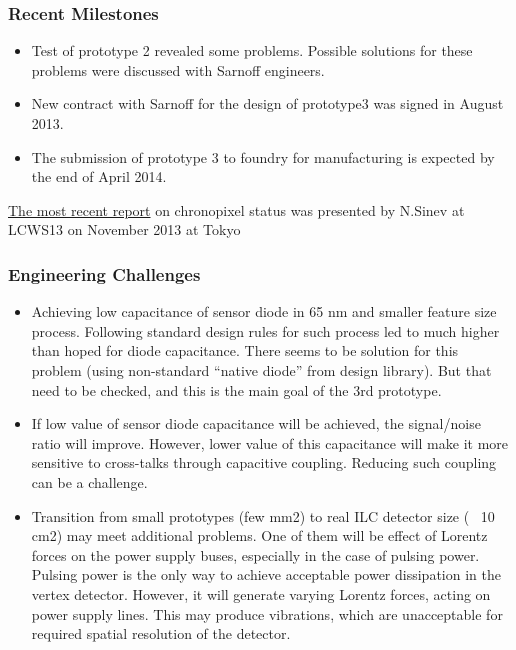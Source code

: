 \subsubsection{Recent Milestones}
\begin{itemize}
    \item Test of prototype 2 revealed some problems. Possible solutions for these problems were discussed with Sarnoff engineers.  
    \item New contract with Sarnoff for the design of prototype3 was signed in August 2013.
    \item The submission of prototype 3 to foundry for manufacturing is expected by the end of April 2014.
\end{itemize}
\href{https://agenda.linearcollider.org/getFile.py/access?contribId=309&sessionId=37&resId=1&materialId=slides&confId=6000}{The most recent report} on chronopixel status was presented by N.Sinev at LCWS13 on November 2013 at Tokyo 

\subsubsection{Engineering Challenges}
\begin{itemize}
    \item Achieving low capacitance of sensor diode in 65 nm and smaller feature size process. Following standard design rules for such process led to much higher than hoped for diode capacitance. There seems to be solution for this problem (using non-standard “native diode” from design library). But that need to be checked, and this is the main goal of the 3rd prototype. 
    \item If low value of sensor diode capacitance will be achieved, the signal/noise ratio will improve. However, lower value of this capacitance will make it more sensitive to cross-talks through capacitive coupling. Reducing such coupling can be a challenge.
    \item Transition from small prototypes (few mm2) to real ILC detector size (~ 10 cm2) may meet additional problems. One of them will be effect of Lorentz forces on the power supply buses, especially in the case of pulsing power. Pulsing power is the only way to achieve acceptable power dissipation in the vertex detector. However, it will generate varying Lorentz forces, acting on power supply lines. This may produce vibrations, which are unacceptable for required spatial resolution of the detector.
\end{itemize}

